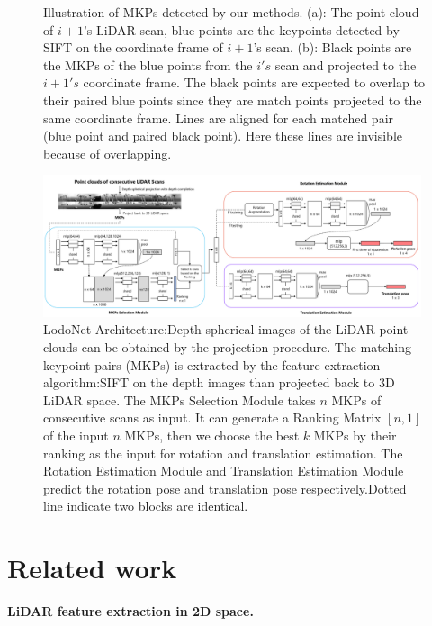 \documentclass[sigconf]{acmart}
\def\lodo{LodoNet}
\newcommand{\bfsection}[1]{\vspace*{0.1cm}\noindent\textbf{#1.}}
\begin{document}
\begin{figure}[t!]
        \caption{\footnotesize {Illustration of MKPs detected by our methods. (a): The point cloud of $i+1$'s LiDAR scan, blue points are the keypoints detected by SIFT on the coordinate frame of  $i+1$'s scan. (b): Black points are the MKPs of the blue points from the $i's$ scan and projected to the $i+1's$ coordinate frame. The black points are expected to overlap to their paired blue points since they are match points projected to the same coordinate frame. Lines are aligned for each matched pair (blue point and paired black point). Here these lines are invisible because of overlapping. }}
        \label{fig:matching3D}
\end{figure}


\begin{figure}[h]
  \centering
  \includegraphics[width=0.99\textwidth]{Figures/network.png}
  \vspace{-1em}
  \caption{\footnotesize{\lodo{} Architecture:Depth spherical images of the LiDAR point clouds can be obtained by the projection procedure. The matching keypoint pairs (MKPs) is extracted by the feature extraction algorithm:SIFT on the depth images than projected back to 3D LiDAR space. The MKPs Selection Module takes $n$ MKPs of consecutive scans as input. It can generate a Ranking Matrix $[n, 1]$ of the input $n$ MKPs, then we choose the best $k$ MKPs by their ranking as the input for rotation and translation estimation. The Rotation Estimation Module and Translation Estimation Module predict the rotation pose and translation pose respectively.Dotted line indicate two blocks are identical.}}
  \label{fig:network}
\end{figure}

\section{Related work}
\bfsection{LiDAR feature extraction in 2D space}
\end{document}
